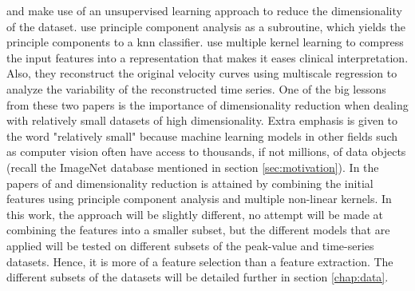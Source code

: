 \textcite{hf_diagnosis_ml} and \textcite{myocardial_motion_pattern} make use of an unsupervised learning approach to reduce the dimensionality of the dataset. \textcite{hf_diagnosis_ml} use principle component analysis as a subroutine, which yields the principle components to a \acrshort{knn} classifier. \textcite{myocardial_motion_pattern} use multiple kernel learning to compress the input features into a representation that makes it eases clinical interpretation. Also, they reconstruct the original velocity curves using multiscale regression to analyze the variability of the reconstructed time series. One of the big lessons from these two papers is the importance of dimensionality reduction when dealing with relatively small datasets of high dimensionality. Extra emphasis is given to the word "relatively small" because machine learning models in other fields such as computer vision often have access to thousands, if not millions, of data objects (recall the ImageNet database mentioned in section \ref{sec:motivation}). In the papers of \textcite{hf_diagnosis_ml} and \textcite{myocardial_motion_pattern} dimensionality reduction is attained by combining the initial features using principle component analysis and multiple non-linear kernels. In this work, the approach will be slightly different, no attempt will be made at combining the features into a smaller subset, but the different models that are applied will be tested on different subsets of the peak-value and time-series datasets. Hence, it is more of a feature selection than a feature extraction. The different subsets of the datasets will be detailed further in section \ref{chap:data}.